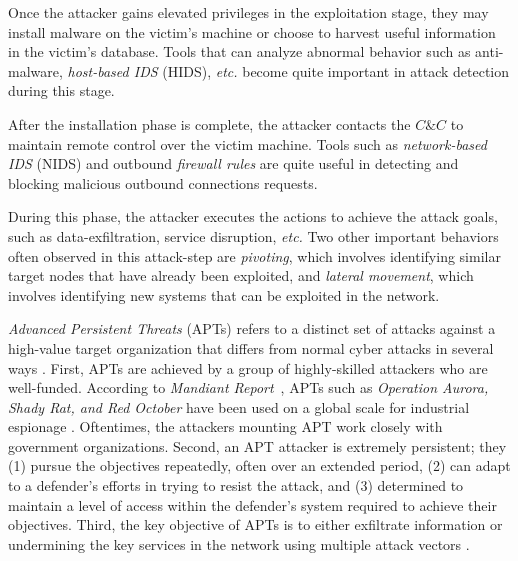 Once the attacker gains elevated privileges in the exploitation stage, they may install malware on the victim's machine or choose to harvest useful information in the victim's database. Tools that can analyze abnormal behavior such as anti-malware, \emph{host-based IDS} (HIDS), {\em etc.} become quite important in attack detection during this stage.

After the installation phase is complete, the attacker contacts the $C\&C$ to maintain remote control over the victim machine. Tools such as \emph{network-based IDS} (NIDS) and outbound \emph{firewall rules} are quite useful in detecting and blocking malicious outbound connections requests.

During this phase, the attacker executes the actions to achieve the attack goals, such as data-exfiltration, service disruption, {\em etc.} Two other important behaviors often observed in this attack-step are \emph{pivoting}, which involves identifying similar target nodes that have already been exploited, and \emph{lateral movement}, which involves identifying new systems that can be exploited in the network.

\label{aptdef}
\emph{Advanced Persistent Threats} (APTs) refers to a distinct set of attacks against a high-value target organization that differs from normal cyber attacks in several ways . First, APTs are achieved by a group of highly-skilled attackers who are well-funded. According to \emph{Mandiant Report}~, APTs such as \emph{Operation Aurora, Shady Rat, and Red October} have been used on a global scale for industrial espionage . Oftentimes, the attackers mounting APT work closely with government organizations. Second, an APT attacker is extremely persistent; they (1) pursue the objectives repeatedly, often over an extended period, (2) can adapt to a defender's efforts in trying to resist the attack, and (3) determined to maintain a level of access within the defender's system required to achieve their objectives. Third, the key objective of APTs is to either exfiltrate information or undermining the key services in the network using multiple attack vectors .

